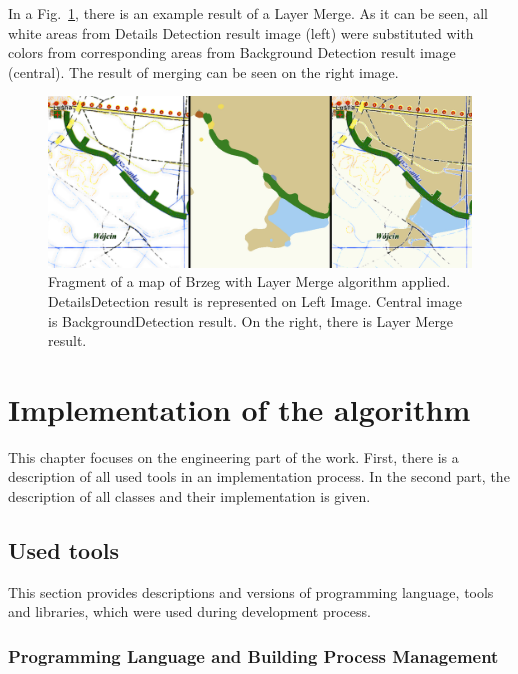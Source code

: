\documentclass[a4paper,onecolumn,oneside,12pt]{memoir}
\begin{document}
In a Fig.~\ref{layerMergeResult}, there is an example result of a Layer Merge. As it can be seen,
all white areas from Details Detection result image (left) were substituted with colors from
corresponding areas from Background Detection result image (central). The result of merging can be
seen on the right image.

\begin{figure}[!ht]
\begin{center}
\includegraphics[scale=0.3]{images/layersAndMergedImage.png}
\caption{Fragment of a map of Brzeg with Layer Merge algorithm applied.
DetailsDetection result is represented on Left Image. Central image is
BackgroundDetection result. On the right, there is Layer Merge result.}
\label{layerMergeResult}
\end{center}
\end{figure}

\chapter{Implementation of the algorithm}

This chapter focuses on the engineering part of the work. First, there is a description of all used
tools in an implementation process. In the second part, the description of all classes and
their implementation is given.

\section{Used tools}

This section provides descriptions and versions of programming language, tools and libraries, which
were used during development process.

\subsection{Programming Language and Building Process Management}
\end{document}
